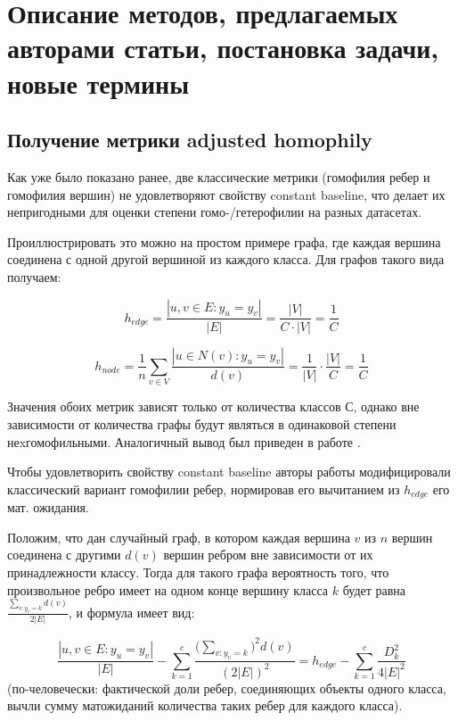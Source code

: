\documentclass[a4paper,14pt]{article}
\begin{document}
	\pagebreak
	\section{Описание методов, предлагаемых авторами статьи, постановка задачи, новые термины}
	\setcounter{figure}{0}
	
	\subsection{Получение метрики adjusted homophily}
	
	Как уже было показано ранее, две классические метрики (гомофилия ребер и гомофилия вершин) не удовлетворяют свойству constant baseline, что делает их непригодными для оценки степени гомо-/гетерофилии на разных датасетах.
	
	Проиллюстрировать это можно на простом примере графа, где каждая вершина соединена с одной другой вершиной из каждого класса.
	Для графов такого вида получаем:
	
	$$ h_{edge} = \dfrac{ |{u, v} \in E: y_u = y_v| }{ |E| } = \dfrac{ |V| }{ C \cdot |V| } = \frac{1}{C} $$
	
	$$ h_{node} = \dfrac{1}{n} \sum_{v \in V} \dfrac{|u \in N(v): y_u = y_v|}{ d(v) } = \dfrac{1}{|V|} \cdot \dfrac{|V|}{C} = \dfrac{1}{C} $$
	
	Значения обоих метрик зависят только от количества классов С, однако вне зависимости от количества графы будут являться в одинаковой степени неxгомофильными.
	Аналогичный вывод был приведен в работе \cite{lim2021large}.
	
	Чтобы удовлетворить свойству constant baseline авторы работы модифицировали классический вариант гомофилии ребер, нормировав его вычитанием из $ h_{edge} $ его мат. ожидания.
	
	Положим, что дан случайный граф, в котором каждая вершина $v$ из $n$ вершин соединена с другими $d(v)$ вершин ребром вне зависимости от их принадлежности классу.
	Тогда для такого графа вероятность того, что произвольное ребро имеет на одном конце вершину класса $k$ будет равна $ \frac{\sum_{v: y_v = k} d(v)}{2|E|} $, и формула имеет вид:
	
	$$ \frac{ |{u, v} \in E: y_u = y_v| }{ |E| } - \sum_{k=1}^{c} \frac{\bigl( \sum_{v: y_v = k} \bigr)^2 d(v)}{(2|E|)^2} = h_{edge} - \sum_{k=1}^{c} \frac{D_k^2}{4|E|^2} $$ (по-человечески: фактической доли ребер, соединяющих объекты одного класса, вычли сумму матожиданий количества таких ребер для каждого класса).
	
\end{document}
